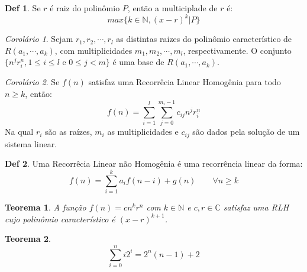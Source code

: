 \documentclass[a4paper,11pt]{article}
\theoremstyle{definition} \newtheorem{definicao}{Def}
\theoremstyle{definition} \newtheorem{exemplo}{Exemplo}
\theoremstyle{plain}      \newtheorem{teorema}{Teorema}
\theoremstyle{remark}     \newtheorem*{corolario}{Corol\'{a}rio}
\begin{document}
\begin{definicao}
Se $r$ \'{e} raiz do polin\^{o}mio $P$, ent\~{a}o a multiciplade
de $r$ \'{e}:
\begin{equation*}
max\{k \in \mathbb{N}, (x-r)^k | P\}
\end{equation*}
\end{definicao}

\begin{corolario}
Sejam $r_1,r_2,\cdots,r_l$ as distintas raizes do polin\^{o}mio
caracter\'{i}stico de $R(a_1, \cdots, a_k)$, com multiplicidades
$m_1,m_2,\cdots,m_l$, respectivamente. O conjunto
$\{n^j r_i^n, 1 \leq i \leq l$ e $0 \leq j < m\}$ \'{e} uma base
de $R(a_1, \cdots, a_k)$.
\end{corolario}

\begin{corolario}
Se $f(n)$ satisfaz uma Recorr\^{e}cia Linear Homog\^{e}nia para todo
$n \geq k$, ent\~{a}o:
\begin{equation*}
f(n) = \sum_{i=1}^{l}\sum_{j=0}^{m_i-1} c_{ij} n^j r_i^n
\end{equation*}
Na qual $r_i$ s\~{a}o as ra\'{i}zes, $m_i$ as multiplicidades e
$c_{ij}$ s\~{a}o dados pela solu\c{c}\~{a}o de um sistema linear.
\end{corolario}

\begin{definicao}
Uma Recorr\^{e}cia Linear n\~{a}o Homog\^{e}nia \'{e} uma
recorr\^{e}ncia linear da forma:
\begin{equation*}
f(n) = \sum_{i=1}^{k} a_i f(n-i) + g(n) \qquad \forall n \geq k
\end{equation*}
\end{definicao}

\begin{teorema}
A fun\c{c}\~{a}o $f(n) = c n^k r^n$ com $k \in \mathbb{N}$ e
$c,r \in \mathbb{C}$ satisfaz uma RLH cujo polin\^{o}mio
caracter\'{i}stico \'{e} $(x-r)^{k+1}$.
\end{teorema}

\begin{teorema}
\begin{equation*}
\sum_{i=0}^{n} i 2^i = 2^n(n-1) + 2
\end{equation*}
\end{teorema}
\end{document}
